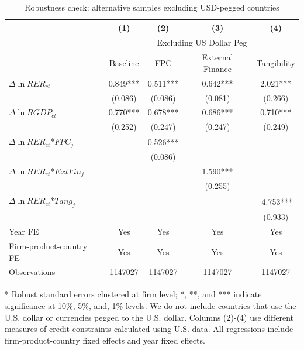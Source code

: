 \documentclass[12pt]{article}
\begin{document}
\begin{table}[htbp]
	\centering
	\caption{Robustness check: alternative samples excluding USD-pegged countries}
	\begin{threeparttable}
	\begin{tabular}{lcccc}
		\toprule
		& (1)   & (2)   & (3)   & (4) \\
		\midrule
		& \multicolumn{4}{c}{Excluding US Dollar Peg} \\
		& Baseline & FPC   & External Finance & Tangibility \\
		\midrule
		$\Delta \ln RER_{ct}$ & 0.849*** & 0.511*** & 0.642*** & 2.021*** \\
		& (0.086) & (0.086) & (0.081) & (0.266) \\
		$\Delta \ln RGDP_{ct}$ & 0.770*** & 0.678*** & 0.686*** & 0.710*** \\
		& (0.252) & (0.247) & (0.247) & (0.249) \\
		$\Delta \ln RER_{ct}$*$FPC_{j}$ &    & 0.526*** &       &  \\
            & & (0.086) &       &  \\
		$\Delta \ln RER_{ct}$*$ExtFin_{j}$ & &       & 1.590*** &  \\
		& &       & (0.255) &  \\
		$\Delta \ln RER_{ct}$*$Tang_{j}$ & &       &       & -4.753*** \\
		& &       &       & (0.933) \\
		Year FE  &   Yes    & Yes   & Yes   & Yes \\
		Firm-product-country FE &   Yes    & Yes   & Yes   & Yes \\
		Observations & 1147027 & 1147027 & 1147027 & 1147027 \\
		\bottomrule
	\end{tabular}
	\begin{tablenotes}
		\footnotesize
		\item[*] Robust standard errors clustered at firm level; *, **, and *** indicate significance at 10\%, 5\%, and, 1\% levels. We do not include countries that use the U.S. dollar or currencies pegged to the U.S. dollar. Columns (2)-(4) use different measures of credit constraints calculated using U.S. data. All regressions include firm-product-country fixed effects and year fixed effects.
	\end{tablenotes}
        \end{threeparttable}
        \label{tab.robust.nopeg}
\end{table}
\end{document}
